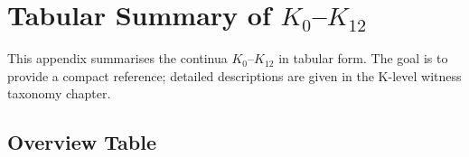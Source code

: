 
\section{Tabular Summary of \texorpdfstring{$K_0$–$K_{12}$}{K0–K12}}
\label{app:klevels-tables}

This appendix summarises the continua \(K_0\)–\(K_{12}\) in tabular form.
The goal is to provide a compact reference; detailed descriptions are given in
the K-level witness taxonomy chapter.

\begingroup
\footnotesize
\RaggedRight
\sloppy
\setlength{\tabcolsep}{4pt}

\subsection{Overview Table}

